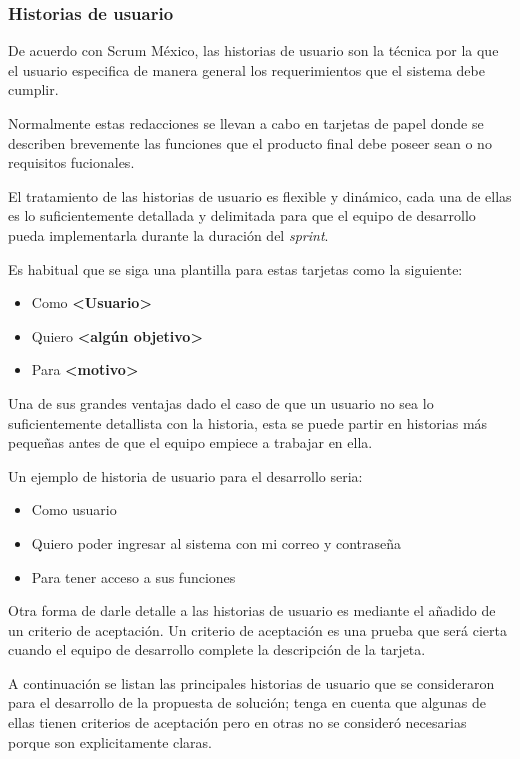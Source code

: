 \subsubsection{Historias de usuario}

De acuerdo con Scrum México\cite{scrum_mexico_scrum_2020}, las historias de usuario son la técnica por la que el usuario especifica de manera general los requerimientos que el sistema debe cumplir.


Normalmente estas redacciones se llevan a cabo en tarjetas de papel donde se describen brevemente las funciones que el producto final debe poseer sean o no requisitos fucionales.


El tratamiento de las historias de usuario es flexible y dinámico, cada una de ellas es lo suficientemente detallada y delimitada para que el equipo de desarrollo pueda implementarla durante la duración del \textit{sprint}.


Es habitual que se siga una plantilla para estas tarjetas como la siguiente:

\begin{itemize}
	\item Como \textbf{<Usuario>}
	\item Quiero \textbf{<algún objetivo>}
	\item Para \textbf{<motivo>}
\end{itemize}


Una de sus grandes ventajas dado el caso de que un usuario no sea lo suficientemente detallista con la historia, esta se puede partir en historias más pequeñas antes de que el equipo empiece a trabajar en ella.


Un ejemplo de historia de usuario para el desarrollo seria:

\begin{itemize}
	\item Como usuario
	\item Quiero poder ingresar al sistema con mi correo y contraseña
	\item Para tener acceso a sus funciones
\end{itemize}


Otra forma de darle detalle a las historias de usuario es mediante el añadido de un criterio de aceptación. Un criterio de aceptación es una prueba que será cierta cuando el equipo de desarrollo complete la descripción de la tarjeta.


A continuación se listan las principales historias de usuario que se consideraron para el desarrollo de la propuesta de solución; tenga en cuenta que algunas de ellas tienen criterios de aceptación pero en otras no se consideró necesarias porque son explicitamente claras.


